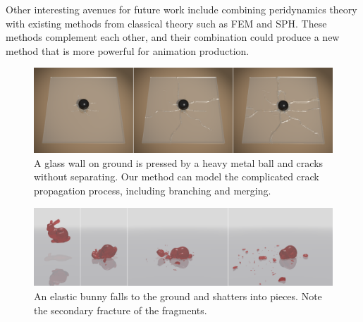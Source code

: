 Other interesting avenues for future work include combining peridynamics theory with existing methods from classical theory such as FEM and SPH. These methods complement each other, and their combination could produce a new method that is more powerful for animation production.
\begin{figure}[t]
  \centering
  \includegraphics[width=\linewidth]{../figs/revision/demo_brittle_fall.png}
  \caption{\label{fig:14}
  A glass wall on ground is pressed by a heavy metal ball and cracks without separating. Our method can model the complicated crack propagation process, including branching and merging.
}
\end{figure}
\begin{figure}[t]
  \centering
  \includegraphics[width=\linewidth]{../figs/demo_fall_bunny.png}
  \caption{\label{fig:15}
  An elastic bunny falls to the ground and shatters into pieces. Note the secondary fracture of the fragments.
}
\end{figure}
